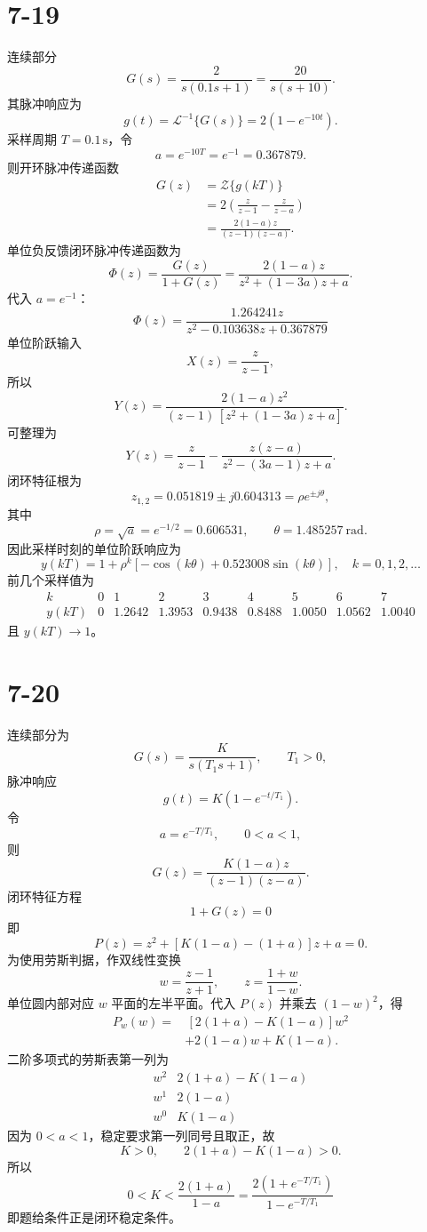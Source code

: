 \documentclass[UTF8,a4paper,11pt]{ctexart}
\begin{document}
\section*{7-19}
连续部分
\[
G(s)=\frac{2}{s(0.1s+1)}=\frac{20}{s(s+10)}.
\]
其脉冲响应为
\[
g(t)=\mathcal L^{-1}\{G(s)\}=2(1-e^{-10t}).
\]
采样周期 $T=0.1\,\mathrm{s}$，令
\[
a=e^{-10T}=e^{-1}=0.367879.
\]
则开环脉冲传递函数
\[
\begin{aligned}
G(z)
&=\mathcal Z\{g(kT)\}\\
&=2\left(\frac{z}{z-1}-\frac{z}{z-a}\right)\\
&=\frac{2(1-a)z}{(z-1)(z-a)}.
\end{aligned}
\]
单位负反馈闭环脉冲传递函数为
\[
\Phi(z)=\frac{G(z)}{1+G(z)}
=\frac{2(1-a)z}{z^2+(1-3a)z+a}.
\]
代入 $a=e^{-1}$：
\[
\boxed{\Phi(z)=\frac{1.264241z}{z^2-0.103638z+0.367879}}
\]
单位阶跃输入
\[
X(z)=\frac{z}{z-1},
\]
所以
\[
Y(z)=\frac{2(1-a)z^2}{(z-1)\,[z^2+(1-3a)z+a]}.
\]
可整理为
\[
Y(z)=\frac{z}{z-1}
-\frac{z(z-a)}{z^2-(3a-1)z+a}.
\]
闭环特征根为
\[
z_{1,2}=0.051819\pm j0.604313=\rho e^{\pm j\theta},
\]
其中
\[
\rho=\sqrt a=e^{-1/2}=0.606531,\qquad
\theta=1.485257\ \mathrm{rad}.
\]
因此采样时刻的单位阶跃响应为
\[
\boxed{
y(kT)=1+\rho^k\left[-\cos(k\theta)+0.523008\sin(k\theta)\right],
\quad k=0,1,2,\ldots}
\]
前几个采样值为
\[
\begin{array}{c|cccccccc}
k&0&1&2&3&4&5&6&7\\ \hline
y(kT)&0&1.2642&1.3953&0.9438&0.8488&1.0050&1.0562&1.0040
\end{array}
\]
且 $y(kT)\to1$。

\section*{7-20}
连续部分为
\[
G(s)=\frac{K}{s(T_1s+1)},\qquad T_1>0,
\]
脉冲响应
\[
g(t)=K(1-e^{-t/T_1}).
\]
令
\[
a=e^{-T/T_1},\qquad 0<a<1,
\]
则
\[
G(z)=\frac{K(1-a)z}{(z-1)(z-a)}.
\]
闭环特征方程
\[
1+G(z)=0
\]
即
\[
P(z)=z^2+[K(1-a)-(1+a)]z+a=0.
\]
为使用劳斯判据，作双线性变换
\[
w=\frac{z-1}{z+1},\qquad z=\frac{1+w}{1-w}.
\]
单位圆内部对应 $w$ 平面的左半平面。代入 $P(z)$ 并乘去 $(1-w)^2$，得
\[
\begin{aligned}
P_w(w)=&\,[2(1+a)-K(1-a)]w^2\\
&+2(1-a)w+K(1-a).
\end{aligned}
\]
二阶多项式的劳斯表第一列为
\[
\begin{array}{c|c}
w^2&2(1+a)-K(1-a)\\
w^1&2(1-a)\\
w^0&K(1-a)
\end{array}
\]
因为 $0<a<1$，稳定要求第一列同号且取正，故
\[
K>0,\qquad 2(1+a)-K(1-a)>0.
\]
所以
\[
\boxed{
0<K<\frac{2(1+a)}{1-a}
=\frac{2(1+e^{-T/T_1})}{1-e^{-T/T_1}}}
\]
即题给条件正是闭环稳定条件。
\end{document}
